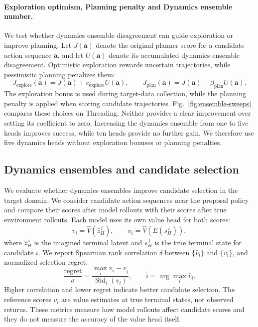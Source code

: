 \documentclass{article} %
\begin{document}
\paragraph{Exploration optimism, Planning penalty and Dynamics ensemble number.} We test whether dynamics ensemble disagreement can guide exploration or improve planning. Let $J(\mathbf a)$ denote the original planner score for a candidate action sequence $\mathbf a$, and let $U(\mathbf a)$ denote its accumulated dynamics ensemble disagreement. Optimistic exploration rewards uncertain trajectories, while pessimistic planning penalizes them:
\begin{equation}
  J_{\mathrm{explore}}(\mathbf a) = J(\mathbf a) + c_{\mathrm{explore}} U(\mathbf a),
  \qquad
  J_{\mathrm{plan}}(\mathbf a) = J(\mathbf a) - \beta_{\mathrm{plan}} U(\mathbf a).
\end{equation}
The exploration bonus is used during target-data collection, while the planning penalty is applied when scoring candidate trajectories. Fig.~\ref{fig:ensemble-sweeps} compares these choices on Threading. Neither provides a clear improvement over setting its coefficient to zero. Increasing the dynamics ensemble from one to five heads improves success, while ten heads provide no further gain. We therefore use five dynamics heads without exploration bonuses or planning penalties.

\subsection{Dynamics ensembles and candidate selection}
\label{app:ensemble-ranking}

We evaluate whether dynamics ensembles improve candidate selection in the target domain. We consider candidate action sequences near the proposal policy and compare their scores after model rollouts with their scores after true environment rollouts. Each model uses its own value head for both scores:
\begin{equation}
\hat v_i = \hat V(\hat z_H^{\,i}), \qquad
v_i = \hat V(E(s_H^{\,i})),
\end{equation}
where $\hat z_H^{\,i}$ is the imagined terminal latent and $s_H^{\,i}$ is the true terminal state for candidate $i$. We report Spearman rank correlation $\delta$ between $\{\hat v_i\}$ and $\{v_i\}$, and normalized selection regret:
\begin{equation}
\frac{\mathrm{regret}}{\sigma}
= \frac{\max_i v_i-v_{\hat i}}{\operatorname{Std}_i(v_i)},
\qquad \hat i=\arg\max_i \hat v_i.
\end{equation}
Higher correlation and lower regret indicate better candidate selection. The reference scores $v_i$ are value estimates at true terminal states, not observed returns. These metrics measure how model rollouts affect candidate scores and they do not measure the accuracy of the value head itself.
\end{document}

